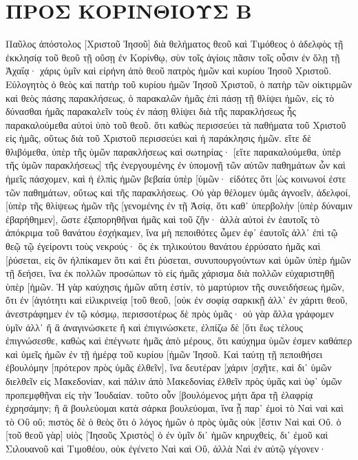 \section{ΠΡΟΣ ΚΟΡΙΝΘΙΟΥΣ Β}
Παῦλος ἀπόστολος [Χριστοῦ Ἰησοῦ] διὰ θελήματος θεοῦ καὶ Τιμόθεος ὁ ἀδελφὸς τῇ ἐκκλησίᾳ τοῦ θεοῦ τῇ οὔσῃ ἐν Κορίνθῳ, σὺν τοῖς ἁγίοις πᾶσιν τοῖς οὖσιν ἐν ὅλῃ τῇ Ἀχαΐᾳ· 
χάρις ὑμῖν καὶ εἰρήνη ἀπὸ θεοῦ πατρὸς ἡμῶν καὶ κυρίου Ἰησοῦ Χριστοῦ. 
Εὐλογητὸς ὁ θεὸς καὶ πατὴρ τοῦ κυρίου ἡμῶν Ἰησοῦ Χριστοῦ, ὁ πατὴρ τῶν οἰκτιρμῶν καὶ θεὸς πάσης παρακλήσεως, 
ὁ παρακαλῶν ἡμᾶς ἐπὶ πάσῃ τῇ θλίψει ἡμῶν, εἰς τὸ δύνασθαι ἡμᾶς παρακαλεῖν τοὺς ἐν πάσῃ θλίψει διὰ τῆς παρακλήσεως ἧς παρακαλούμεθα αὐτοὶ ὑπὸ τοῦ θεοῦ. 
ὅτι καθὼς περισσεύει τὰ παθήματα τοῦ Χριστοῦ εἰς ἡμᾶς, οὕτως διὰ τοῦ Χριστοῦ περισσεύει καὶ ἡ παράκλησις ἡμῶν. 
εἴτε δὲ θλιβόμεθα, ὑπὲρ τῆς ὑμῶν παρακλήσεως καὶ σωτηρίας· [εἴτε παρακαλούμεθα, ὑπὲρ τῆς ὑμῶν παρακλήσεως] τῆς ἐνεργουμένης ἐν ὑπομονῇ τῶν αὐτῶν παθημάτων ὧν καὶ ἡμεῖς πάσχομεν, 
καὶ ἡ ἐλπὶς ἡμῶν βεβαία ὑπὲρ [ὑμῶν· εἰδότες ὅτι [ὡς κοινωνοί ἐστε τῶν παθημάτων, οὕτως καὶ τῆς παρακλήσεως. 
Οὐ γὰρ θέλομεν ὑμᾶς ἀγνοεῖν, ἀδελφοί, [ὑπὲρ τῆς θλίψεως ἡμῶν τῆς [γενομένης ἐν τῇ Ἀσίᾳ, ὅτι καθ᾽ ὑπερβολὴν [ὑπὲρ δύναμιν ἐβαρήθημεν], ὥστε ἐξαπορηθῆναι ἡμᾶς καὶ τοῦ ζῆν· 
ἀλλὰ αὐτοὶ ἐν ἑαυτοῖς τὸ ἀπόκριμα τοῦ θανάτου ἐσχήκαμεν, ἵνα μὴ πεποιθότες ὦμεν ἐφ᾽ ἑαυτοῖς ἀλλ᾽ ἐπὶ τῷ θεῷ τῷ ἐγείροντι τοὺς νεκρούς· 
ὃς ἐκ τηλικούτου θανάτου ἐρρύσατο ἡμᾶς καὶ [ῥύσεται, εἰς ὃν ἠλπίκαμεν ὅτι καὶ ἔτι ῥύσεται, 
συνυπουργούντων καὶ ὑμῶν ὑπὲρ ἡμῶν τῇ δεήσει, ἵνα ἐκ πολλῶν προσώπων τὸ εἰς ἡμᾶς χάρισμα διὰ πολλῶν εὐχαριστηθῇ ὑπὲρ [ἡμῶν. 
Ἡ γὰρ καύχησις ἡμῶν αὕτη ἐστίν, τὸ μαρτύριον τῆς συνειδήσεως ἡμῶν, ὅτι ἐν [ἁγιότητι καὶ εἰλικρινείᾳ [τοῦ θεοῦ, [οὐκ ἐν σοφίᾳ σαρκικῇ ἀλλ᾽ ἐν χάριτι θεοῦ, ἀνεστράφημεν ἐν τῷ κόσμῳ, περισσοτέρως δὲ πρὸς ὑμᾶς· 
οὐ γὰρ ἄλλα γράφομεν ὑμῖν ἀλλ᾽ ἢ ἃ ἀναγινώσκετε ἢ καὶ ἐπιγινώσκετε, ἐλπίζω δὲ [ὅτι ἕως τέλους ἐπιγνώσεσθε, 
καθὼς καὶ ἐπέγνωτε ἡμᾶς ἀπὸ μέρους, ὅτι καύχημα ὑμῶν ἐσμεν καθάπερ καὶ ὑμεῖς ἡμῶν ἐν τῇ ἡμέρᾳ τοῦ κυρίου [ἡμῶν Ἰησοῦ. 
Καὶ ταύτῃ τῇ πεποιθήσει ἐβουλόμην [πρότερον πρὸς ὑμᾶς ἐλθεῖν], ἵνα δευτέραν [χάριν [σχῆτε, 
καὶ δι᾽ ὑμῶν διελθεῖν εἰς Μακεδονίαν, καὶ πάλιν ἀπὸ Μακεδονίας ἐλθεῖν πρὸς ὑμᾶς καὶ ὑφ᾽ ὑμῶν προπεμφθῆναι εἰς τὴν Ἰουδαίαν. 
τοῦτο οὖν [βουλόμενος μήτι ἄρα τῇ ἐλαφρίᾳ ἐχρησάμην; ἢ ἃ βουλεύομαι κατὰ σάρκα βουλεύομαι, ἵνα ᾖ παρ᾽ ἐμοὶ τὸ Ναὶ ναὶ καὶ τὸ Οὒ οὔ; 
πιστὸς δὲ ὁ θεὸς ὅτι ὁ λόγος ἡμῶν ὁ πρὸς ὑμᾶς οὐκ [ἔστιν Ναὶ καὶ Οὔ. 
ὁ [τοῦ θεοῦ γὰρ] υἱὸς [Ἰησοῦς Χριστὸς] ὁ ἐν ὑμῖν δι᾽ ἡμῶν κηρυχθείς, δι᾽ ἐμοῦ καὶ Σιλουανοῦ καὶ Τιμοθέου, οὐκ ἐγένετο Ναὶ καὶ Οὒ, ἀλλὰ Ναὶ ἐν αὐτῷ γέγονεν· 
